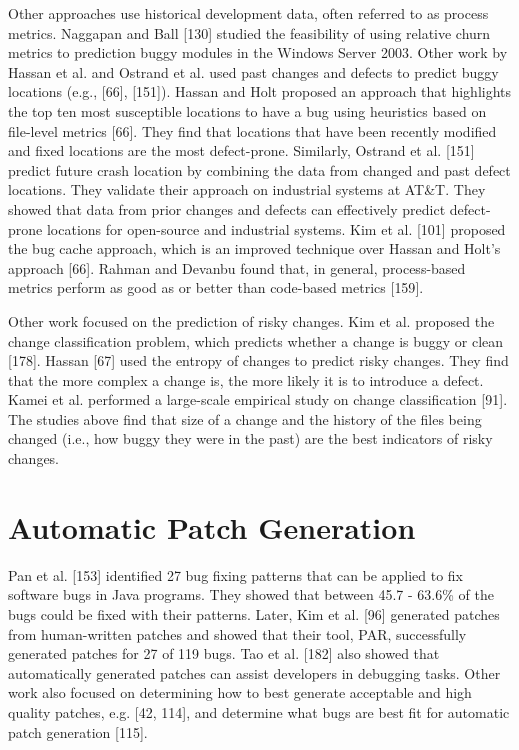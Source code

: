 \documentclass[12pt]{report}
\begin{document}
Other approaches use historical development data, often referred to as
process metrics. Naggapan and Ball {[}130{]} studied the feasibility of
using relative churn metrics to prediction buggy modules in the Windows
Server 2003. Other work by Hassan et al. and Ostrand et al. used past
changes and defects to predict buggy locations (e.g., {[}66{]},
{[}151{]}). Hassan and Holt proposed an approach that highlights the top
ten most susceptible locations to have a bug using heuristics based on
file-level metrics {[}66{]}. They find that locations that have been
recently modified and fixed locations are the most defect-prone.
Similarly, Ostrand et al. {[}151{]} predict future crash location by
combining the data from changed and past defect locations. They validate
their approach on industrial systems at AT\&T. They showed that data
from prior changes and defects can effectively predict defect-prone
locations for open-source and industrial systems. Kim et al. {[}101{]}
proposed the bug cache approach, which is an improved technique over
Hassan and Holt's approach {[}66{]}. Rahman and Devanbu found that, in
general, process-based metrics perform as good as or better than
code-based metrics {[}159{]}.

Other work focused on the prediction of risky changes. Kim et al.
proposed the change classification problem, which predicts whether a
change is buggy or clean {[}178{]}. Hassan {[}67{]} used the entropy of
changes to predict risky changes. They find that the more complex a
change is, the more likely it is to introduce a defect. Kamei et al.
performed a large-scale empirical study on change classification
{[}91{]}. The studies above find that size of a change and the history
of the files being changed (i.e., how buggy they were in the past) are
the best indicators of risky changes.

\section{Automatic Patch Generation}\label{automatic-patch-generation}

Pan et al. {[}153{]} identified 27 bug fixing patterns that can be
applied to fix software bugs in Java programs. They showed that between
45.7 - 63.6\% of the bugs could be fixed with their patterns. Later, Kim
et al. {[}96{]} generated patches from human-written patches and showed
that their tool, PAR, successfully generated patches for 27 of 119 bugs.
Tao et al. {[}182{]} also showed that automatically generated patches
can assist developers in debugging tasks. Other work also focused on
determining how to best generate acceptable and high quality patches,
e.g. {[}42, 114{]}, and determine what bugs are best fit for automatic
patch generation {[}115{]}.
\end{document}
